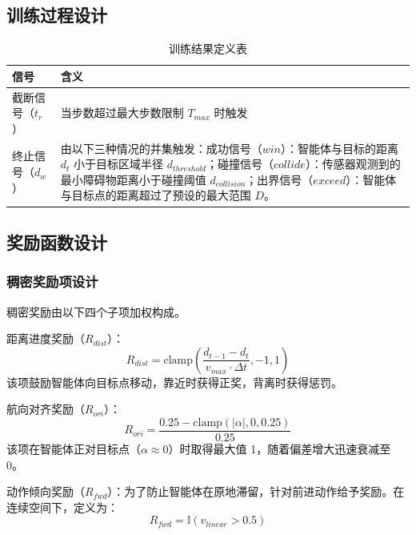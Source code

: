 \documentclass[
  oneside,
  degree=bachelor,
  fullwidthstop=false,
  fontset=fandol,
  times=false,
  minted=true,
  biblatex=true,
]{tongjithesis}
\begin{document}
\subsection{训练过程设计}

\begin{table}[H]
  \centering
  \caption{训练结果定义表}\label{tab:training_definition}
  \renewcommand{\arraystretch}{1.3}
    \begin{tabular}{lp{}}
    \toprule
    \textbf{信号} & \textbf{含义}  \\
    \midrule
    截断信号（$t_r$）& 当步数超过最大步数限制 $T_{max}$ 时触发  \\
        终止信号（$d_w$）& 由以下三种情况的并集触发：成功信号（$win$）：智能体与目标的距离 $d_t$ 小于目标区域半径 $d_{threshold}$；碰撞信号（$collide$）：传感器观测到的最小障碍物距离小于碰撞阈值 $d_{collision}$；出界信号（$exceed$）：智能体与目标点的距离超过了预设的最大范围 $D$。\\
    \bottomrule
  \end{tabular}
\end{table}

\subsection{奖励函数设计}

\subsubsection{稠密奖励项设计}

稠密奖励由以下四个子项加权构成。

距离进度奖励（$R_{dist}$）：
\begin{equation}
    R_{dist} = \mathrm{clamp}\left( \frac{d_{t-1} - d_t}{v_{max} \cdot \Delta t}, -1, 1 \right)
\end{equation}
该项鼓励智能体向目标点移动，靠近时获得正奖，背离时获得惩罚。

航向对齐奖励（$R_{ori}$）：
\begin{equation}
    R_{ori} = \frac{0.25 - \mathrm{clamp}(|\alpha|, 0, 0.25)}{0.25}
\end{equation}
该项在智能体正对目标点（$\alpha \approx 0$）时取得最大值 1，随着偏差增大迅速衰减至 0。

动作倾向奖励（$R_{fwd}$）：为了防止智能体在原地滞留，针对前进动作给予奖励。在连续空间下，定义为：
\begin{equation}
    R_{fwd} = \mathbb{I}(v_{linear} > 0.5)
\end{equation}
\end{document}

